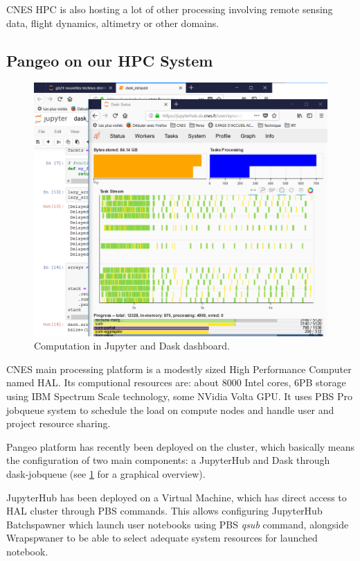 \documentclass{article}
\begin{document}
CNES HPC is also hosting a lot of other processing involving remote sensing data, flight dynamics, altimetry or other domains.

\subsection{Pangeo on our HPC System}
\label{ssec:pangeohpc}

\begin{figure}
  \centering
  \includegraphics[width=\columnwidth]{dask_jobqueue.png}
  \caption{\label{dask_jobqueue} Computation in Jupyter and Dask dashboard.}
\end{figure}

CNES main processing platform is a modestly sized High Performance Computer named HAL. Its computional resources are: about 8000 Intel cores, 6PB storage using IBM Spectrum Scale technology, some NVidia Volta GPU. It uses PBS Pro jobqueue system to schedule the load on compute nodes and handle user and project resource sharing.

Pangeo platform has recently been deployed on the cluster, which basically means the configuration of two main components: a JupyterHub and Dask through dask-jobqueue (see \ref{dask_jobqueue} for a graphical overview).

JupyterHub has been deployed on a Virtual Machine, which has direct access to HAL cluster through PBS commands. This allows configuring JupyterHub Batchspawner which launch user notebooks using PBS \textit{qsub} command, alongside Wrapspwaner to be able to select adequate system resources for launched notebook.
\end{document}
